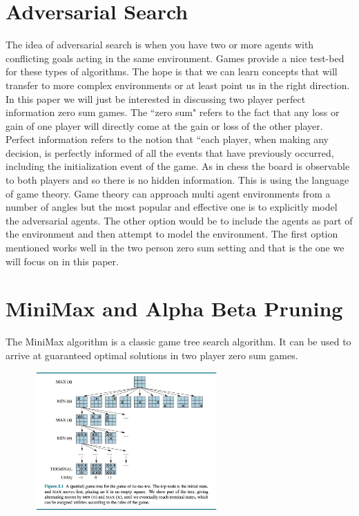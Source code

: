 \begin{search_page}
    \section{Adversarial Search}

The idea of adversarial search is when you have two or more agents with conflicting goals acting in the same environment. Games provide a nice test-bed for these types of algorithms. The hope is that we can learn concepts that will transfer to more complex environments or at least point us in the right direction. In this paper we will just be interested in discussing two player perfect information zero sum games. The ``zero sum" refers to the fact that any loss or gain of one player will directly come at the gain or loss of the other player. Perfect information refers to the notion that ``each player, when making any decision, is perfectly informed of all the events that have previously occurred, including the initialization event of the game. As in chess the board is observable to both players and so there is no hidden information. This is using the language of game theory. Game theory can approach multi agent environments from a number of angles but the most popular and effective one is to explicitly model the adversarial agents. The other option would be to include the agents as part of the environment and then attempt to model the environment. The first option mentioned works well in the two person zero sum setting and that is the one we will focus on in this paper. 

\section{MiniMax and Alpha Beta Pruning}

The MiniMax algorithm is a classic game tree search algorithm. It can be used to arrive at guaranteed optimal solutions in two player zero sum games. 

\includegraphics[width=350px,height=200px]{images/aim_figure_5_1.png}


\end{search_page}
